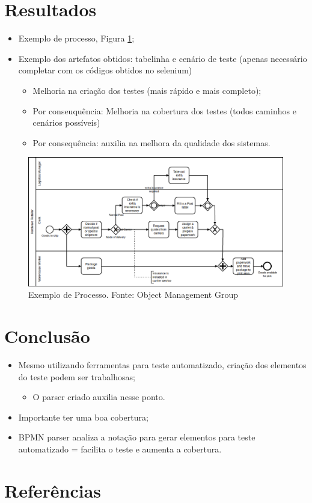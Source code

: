 \documentclass[12pt]{article}
\begin{document}
\section{Resultados}
\begin{itemize}
\item Exemplo de processo, Figura \ref{fig:diagrama_exemplo};
\item Exemplo dos artefatos obtidos: tabelinha e cenário de teste (apenas necessário completar com os códigos obtidos no selenium)
	\begin{itemize}
	\item Melhoria na criação dos testes (mais rápido e mais completo);
	\item Por conseuquência: Melhoria na cobertura dos testes (todos caminhos e cenários possíveis)
	\item Por consequência: auxilia na melhora da qualidade dos sistemas.
	\end{itemize}
\end{itemize}

\begin{figure}[ht]
\centering
\includegraphics[width=.8\paperwidth]{figuras/diagrama_exemplo.png}
\caption{Exemplo de Processo. Fonte: Object Management Group}
\label{fig:diagrama_exemplo}
\end{figure}

\section{Conclusão}
\begin{itemize}
\item Mesmo utilizando ferramentas para teste automatizado, criação dos elementos do teste podem ser trabalhosas;
\begin{itemize}
\item O parser criado auxilia nesse ponto.
\end{itemize}
\item Importante ter uma boa cobertura;
\item BPMN parser analiza a notação para gerar elementos para teste automatizado = facilita o teste e aumenta a cobertura.
\end{itemize}

\section{Referências}



\end{document}
